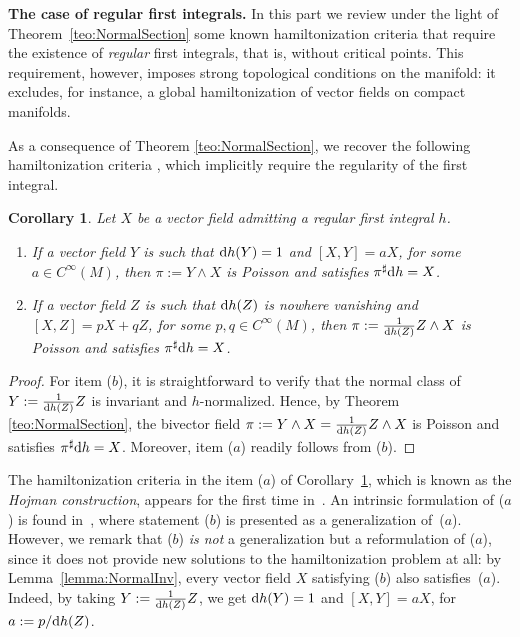 \documentclass[10pt,a4paper]{amsart}
\newcommand{\dd}{{\rm d}}
\numberwithin{equation}{section}
\newtheorem{Corollary}[Theorem]{Corollary}
\begin{document}
{\bf The case of regular first integrals.} In this part we review under the light of Theo\-rem~\ref{teo:NormalSection} some known hamiltonization criteria that require the existence of \emph{regular} first integrals, that is, without critical points. This requirement, however, imposes strong topological conditions on the manifold: it excludes, for instance, a global hamiltonization of vector fields on compact manifolds.

As a consequence of Theorem \ref{teo:NormalSection}, we recover the following hamiltonization criteria \cite{AHA-06,Hojman-96}, which implicitly require the regularity of the first integral.

\begin{Corollary}\label{cor:Hojman}
Let $X$ be a vector field admitting a regular first integral $h$.
 \begin{enumerate}\itemsep=0pt
 \item[$(a)$] If a vector field $Y$ is such that $\dd h(Y) = 1$ and $[X,Y] = aX$, for some $a \in C^{\infty}(M)$, then $\pi := Y \wedge X$ is Poisson and satisfies $\pi^{\sharp}\dd h = X$.
 \item[$(b)$] If a vector field $Z$ is such that $\dd h(Z)$ is nowhere vanishing and $[X,Z] = pX + qZ$, for some $p,q \in C^{\infty}(M)$, then $\pi := \tfrac{1}{\dd h(Z)}Z \wedge X$ is Poisson and satisfies $\pi^{\sharp}\dd h = X$.
 \end{enumerate}
\end{Corollary}
\begin{proof}
For item ($b$), it is straightforward to verify that the normal class of $Y := \tfrac{1}{\dd h(Z)}Z$ is invariant and $h$-normalized. Hence, by Theorem \ref{teo:NormalSection}, the bivector field $\pi := Y \wedge X = \tfrac{1}{\dd h(Z)}Z\wedge X$ is Poisson and satisfies $\pi^{\sharp}\dd h = X$. Moreover, item ($a$) readily follows from ($b$).
\end{proof}

The hamiltonization criteria in the item ($a$) of Corollary~\ref{cor:Hojman}, which is known as the \emph{Hojman construction}, appears for the first time in~\cite{Hojman-96}. An intrinsic formulation of ($a$) is found in~\cite{AHA-06}, where statement ($b$) is presented as a generalization of~($a$). However, we remark that ($b$) \emph{is not} a generalization but a reformulation of ($a$), since it does not provide new solutions to the hamiltonization problem at all: by Lemma~\ref{lemma:NormalInv}, every vector field $X$ satisfying ($b$) also satisfies~($a$). Indeed, by taking $Y := \tfrac{1}{\dd h(Z)}Z$, we get $\dd h(Y) = 1$ and $[X,Y] = aX$, for $a := {p}/{\dd h(Z)}$.
\end{document}
